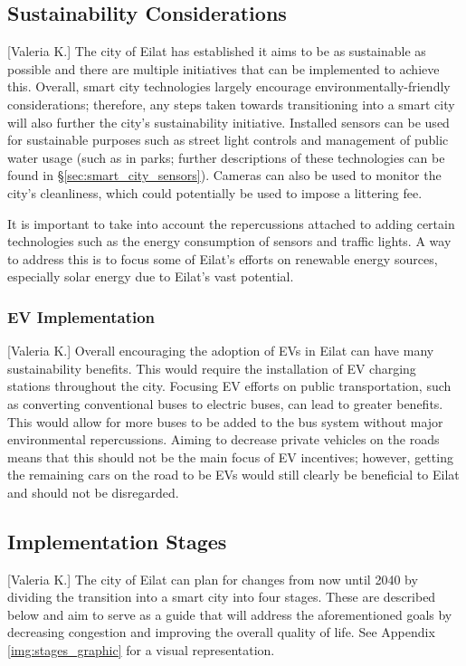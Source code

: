 \documentclass[12pt]{article}                               %
\begin{document}
\subsection{Sustainability Considerations}[Valeria K.]
The city of Eilat has established it aims to be as sustainable as possible and there are multiple initiatives that can be implemented to achieve this. Overall, smart city technologies largely encourage environmentally-friendly considerations; therefore, any steps taken towards transitioning into a smart city will also further the city's sustainability initiative. Installed sensors can be used for sustainable purposes such as street light controls and management of public water usage (such as in parks; further descriptions of these technologies can be found in \S\ref{sec:smart_city_sensors}). Cameras can also be used to monitor the city's cleanliness, which could potentially be used to impose a littering fee. 

It is important to take into account the repercussions attached to adding certain technologies such as the energy consumption of sensors and traffic lights. A way to address this is to focus some of Eilat's efforts on renewable energy sources, especially solar energy due to Eilat's vast potential.

\subsubsection{EV Implementation}[Valeria K.]
Overall encouraging the adoption of EVs in Eilat can have many sustainability benefits. This would require the installation of EV charging stations throughout the city. Focusing EV efforts on public transportation, such as converting conventional buses to electric buses, can lead to greater benefits. This would allow for more buses to be added to the bus system without major environmental repercussions. Aiming to decrease private vehicles on the roads means that this should not be the main focus of EV incentives; however, getting the remaining cars on the road to be EVs would still clearly be beneficial to Eilat and should not be disregarded. 

\subsection{Implementation Stages}[Valeria K.] \label{sec:implementation_stages}
The city of Eilat can plan for changes from now until 2040 by dividing the transition into a smart city into four stages. These are described below and aim to serve as a guide that will address the aforementioned goals by decreasing congestion and improving the overall quality of life. See Appendix \ref{img:stages_graphic} for a visual representation.
\end{document}
